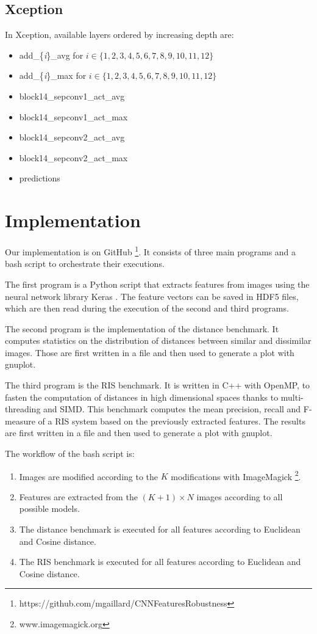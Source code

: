\subsection{Xception}
In Xception, available layers ordered by increasing depth are:
\begin{itemize}
	\item add\_\{\textit{i}\}\_avg for $i \in \{1, 2, 3, 4, 5, 6, 7, 8, 9, 10, 11, 12\}$
	\item add\_\{\textit{i}\}\_max for $i \in \{1, 2, 3, 4, 5, 6, 7, 8, 9, 10, 11, 12\}$
	\item block14\_sepconv1\_act\_avg
	\item block14\_sepconv1\_act\_max
	\item block14\_sepconv2\_act\_avg
	\item block14\_sepconv2\_act\_max
	\item predictions
\end{itemize}

\section{Implementation}
Our implementation is on GitHub \footnote{https://github.com/mgaillard/CNNFeaturesRobustness}. It consists of three main programs and a bash script to orchestrate their executions.

The first program is a Python script that extracts features from images using the neural network library Keras \cite{chollet2015keras}. The feature vectors can be saved in HDF5 files, which are then read during the execution of the second and third programs.

The second program is the implementation of the distance benchmark. It computes statistics on the distribution of distances between similar and dissimilar images. Those are first written in a file and then used to generate a plot with gnuplot.

The third program is the RIS benchmark. It is written in C++ with OpenMP, to fasten the computation of distances in high dimensional spaces thanks to multi-threading and SIMD. This benchmark computes the mean precision, recall and F-measure of a RIS system based on the previously extracted features. The results are first written in a file and then used to generate a plot with gnuplot.

The workflow of the bash script is:
\begin{enumerate}
	\item Images are modified according to the $K$ modifications with ImageMagick \footnote{www.imagemagick.org}.
	\item Features are extracted from the $(K+1) \times N$ images according to all possible models.
	\item The distance benchmark is executed for all features according to Euclidean and Cosine distance.
	\item The RIS benchmark is executed for all features according to Euclidean and Cosine distance.
\end{enumerate}

